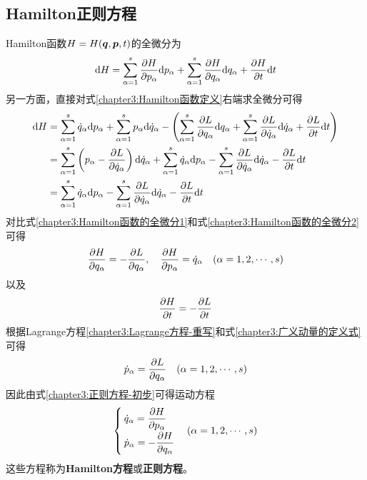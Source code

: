 \subsection{Hamilton正则方程}

Hamilton函数$H=H(\boldsymbol{q},\boldsymbol{p},t)$的全微分为
\begin{equation}
	\mathrm{d} H = \sum_{\alpha=1}^s \frac{\partial H}{\partial p_\alpha} \mathrm{d} p_\alpha + \sum_{\alpha=1}^s \frac{\partial H}{\partial q_\alpha} \mathrm{d} q_\alpha + \frac{\partial H}{\partial t} \mathrm{d} t
	\label{chapter3:Hamilton函数的全微分1}
\end{equation}
另一方面，直接对式\eqref{chapter3:Hamilton函数定义}右端求全微分可得
\begin{align}
	\mathrm{d} H & = \sum_{\alpha=1}^s \dot{q}_\alpha\mathrm{d} p_\alpha + \sum_{\alpha=1}^s p_\alpha\mathrm{d} \dot{q}_\alpha - \left(\sum_{\alpha=1}^s \frac{\partial L}{\partial q_\alpha}\mathrm{d} q_\alpha + \sum_{\alpha=1}^s \frac{\partial L}{\partial \dot{q}_\alpha}\mathrm{d} \dot{q}_\alpha + \frac{\partial L}{\partial t} \mathrm{d} t\right) \nonumber \\
	& = \sum_{\alpha=1}^s \left(p_\alpha - \frac{\partial L}{\partial \dot{q}_\alpha}\right) \mathrm{d} \dot{q}_\alpha + \sum_{\alpha=1}^s \dot{q}_\alpha\mathrm{d} p_\alpha - \sum_{\alpha=1}^s \frac{\partial L}{\partial \dot{q}_\alpha}\mathrm{d} \dot{q}_\alpha - \frac{\partial L}{\partial t} \mathrm{d} t \nonumber \\
	& = \sum_{\alpha=1}^s \dot{q}_\alpha\mathrm{d} p_\alpha - \sum_{\alpha=1}^s \frac{\partial L}{\partial \dot{q}_\alpha}\mathrm{d} \dot{q}_\alpha - \frac{\partial L}{\partial t} \mathrm{d} t
	\label{chapter3:Hamilton函数的全微分2}
\end{align}
对比式\eqref{chapter3:Hamilton函数的全微分1}和式\eqref{chapter3:Hamilton函数的全微分2}可得
\begin{equation}
	\frac{\partial H}{\partial q_\alpha} = -\frac{\partial L}{\partial q_\alpha},\quad \frac{\partial H}{\partial p_\alpha} = \dot{q}_\alpha\quad (\alpha=1,2,\cdots,s)
	\label{chapter3:正则方程-初步}
\end{equation}
以及
\begin{equation}
	\frac{\partial H}{\partial t} = -\frac{\partial L}{\partial t}
	\label{chapter3:正则方程-初步推论}
\end{equation}
根据Lagrange方程\eqref{chapter3:Lagrange方程-重写}和式\eqref{chapter3:广义动量的定义式}可得
\begin{equation*}
	\dot{p}_\alpha = \frac{\partial L}{\partial q_\alpha}\quad (\alpha=1,2,\cdots,s)
\end{equation*}
因此由式\eqref{chapter3:正则方程-初步}可得运动方程
\begin{equation}
\begin{cases}
	\dot{q}_\alpha = \dfrac{\partial H}{\partial p_\alpha} \\[1.5ex]
	\dot{p}_\alpha = -\dfrac{\partial H}{\partial q_\alpha} 
\end{cases}
(\alpha = 1,2,\cdots,s)
\label{chapter3:Hamilton正则方程}
\end{equation}
这些方程称为{\bf Hamilton方程}或{\bf 正则方程}。%

